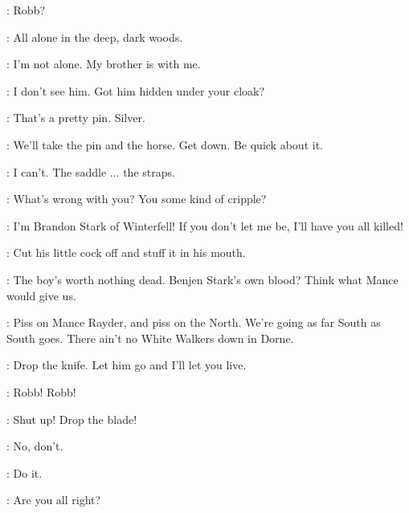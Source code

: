 \BRAN: Robb? 

\OSHA: All alone in the deep, dark woods. 

\BRAN: I'm not alone. My brother is with me. 

\WILDLINGa: I don't see him. Got him hidden under your cloak? 

\OSHA: That's a pretty pin. Silver. 

\WILDLINGa: We'll take the pin and the horse. Get down. Be quick about it. 

\BRAN: I can't. The saddle $\ldots$ the straps. 


\WILDLINGa: What's wrong with you? You some kind of cripple? 

\BRAN: I'm Brandon Stark of Winterfell! If you don't let me be, I'll have you all killed! 


\WILDLINGb: Cut his little cock off and stuff it in his mouth. 

\OSHA: The boy's worth nothing dead. Benjen Stark's own blood? Think what Mance would give us. 

\WILDLINGa: Piss on Mance Rayder, and piss on the North. We're going as far South as South goes. There ain't no White Walkers down in Dorne. 


\ROBB: Drop the knife. Let him go and I'll let you live. 


\BRAN: Robb! Robb! 

\WILDLINGa:  Shut up!  Drop the blade! 

\BRAN: No, don't. 

\WILDLINGa: Do it. 



\ROBB: Are you all right? 

